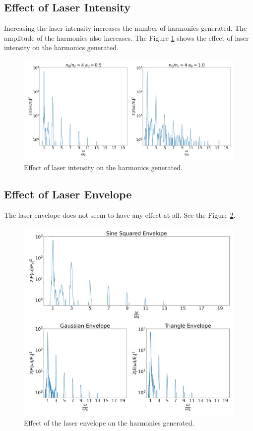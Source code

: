 \documentclass[12pt]{article}
\newenvironment{changemargin}[2]{
\begin{list}{}{
\setlength{\topsep}{0pt}
\setlength{\leftmargin}{#1}
\setlength{\rightmargin}{#2}
\setlength{\listparindent}{\parindent}
\setlength{\itemindent}{\parindent}
\setlength{\parsep}{\parskip}
}
\item[]}{\end{list}}
\begin{document}
\begin{changemargin}{-2cm}{-2cm}
    \subsection{Effect of Laser Intensity}
    Increasing the laser intensity increases the number of harmonics generated. The amplitude of the harmonics also increases. The Figure \ref{fig:intensity} shows the effect of laser intensity on the harmonics generated.

    \begin{figure}[h]
        \centering
        \includegraphics[width=1.0\textwidth, height=0.4\textwidth]{images/intensity.jpg}
        \caption{Effect of laser intensity on the harmonics generated.}
        \label{fig:intensity}
    \end{figure}
    \subsection{Effect of Laser Envelope}
    The laser envelope does not seem to have any effect at all. See the Figure \ref{fig:env}.
    \begin{figure}[t]
        \centering
        \includegraphics[width=1.0\textwidth, height=0.8\textwidth]{images/env.jpg}
        \caption{Effect of the laser envelope on the harmonics generated.}
        \label{fig:env}
    \end{figure}


\end{changemargin}
\end{document}
